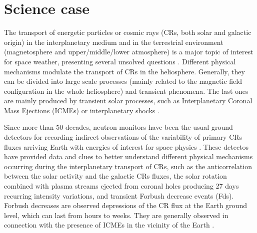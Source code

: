 \section{Science case}\label{sec:science}



The transport of energetic particles or cosmic rays (CRs, both solar and galactic origin) in the
interplanetary medium and in the terrestrial environment (magnetosphere and upper/middle/lower atmosphere)
is a major topic of interest for space weather, presenting several unsolved questions
\cite[e.g., ][]{Wibberenz98, Belov00, Smart09, Kudela13}.
Different physical mechanisms modulate the transport of CRs in the heliosphere.
Generally, they can be divided into large scale processes (mainly related to the magnetic field configuration in the whole heliosphere) and transient phenomena.
The last ones are mainly produced by transient solar processes, such as Interplanetary Coronal Mass Ejections (ICMEs)
or interplanetary shocks \cite[e.g., ][]{Wibberenz98}.

Since more than 50 decades, neutron monitors have been the usual ground detectors for recording indirect 
observations of the variability of primary CRs fluxes arriving Earth with energies of interest
for space physics \cite[e.g., ][]{Meyer55}.
These detectos have provided data and clues to better understand different physical mechanisms
occurring during the interplanetary transport of CRs,
such as the anticorrelation between the solar activity and the galactic CRs fluxes,
the solar rotation combined with plasma streams ejected from coronal holes producing 27 days recurring
intensity variations, and transient Forbush decrease events (Fds).
Forbush decreases are observed depressions of the CR flux at the Earth ground level, which can last from hours to weeks.
They are generally observed in connection with the presence of ICMEs in the vicinity of the Earth \cite[e.g., ][]{Cane00}.

